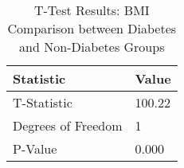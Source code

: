 
\begin{table}[h!]
\centering
\begin{tabular}{|l|l|}
\hline
\textbf{Statistic}       & \textbf{Value} \\ \hline
T-Statistic                & 100.22     \\ \hline
Degrees of Freedom          & 1          \\ \hline
P-Value                    & 0.000      \\ \hline
\end{tabular}

\vspace{0.5cm} %

\caption{T-Test Results: BMI Comparison between Diabetes and Non-Diabetes Groups}
\label{tab:t_test_bmi_results}
\end{table}
